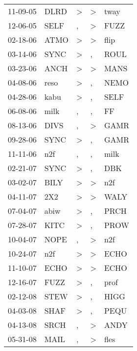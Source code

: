 \begin{supertabular}{lllll}
 11-09-05 &   DLRD &     \textgreater &     \textgreater &   tway \\
 12-06-05 &   SELF &                , &     \textgreater &   FUZZ \\
 02-18-06 &   ATMO &     \textgreater &     \textgreater &   flip \\
 03-14-06 &   SYNC &     \textgreater &                , &   ROUL \\
 03-23-06 &   ANCH &     \textgreater &     \textgreater &   MANS \\
 04-08-06 &   reso &     \textgreater &                , &   NEMO \\
 04-28-06 &   kabu &     \textgreater &                , &   SELF \\
 06-08-06 &   milk &                , &                , &     FF \\
 08-13-06 &   DIVS &                , &     \textgreater &   GAMR \\
 09-28-06 &   SYNC &     \textgreater &                , &   GAMR \\
 11-11-06 &    n2f &                , &                , &   milk \\
 02-21-07 &   SYNC &     \textgreater &                , &    DBK \\
 03-02-07 &   BILY &     \textgreater &     \textgreater &    n2f \\
 04-11-07 &    2X2 &     \textgreater &     \textgreater &   WALY \\
 07-04-07 &   abiw &     \textgreater &                , &   PRCH \\
 07-28-07 &   KITC &     \textgreater &                , &   PROW \\
 10-04-07 &   NOPE &                , &     \textgreater &    n2f \\
 10-24-07 &    n2f &     \textgreater &     \textgreater &   ECHO \\
 11-10-07 &   ECHO &     \textgreater &     \textgreater &   ECHO \\
 12-16-07 &   FUZZ &     \textgreater &                , &   prof \\
 02-12-08 &   STEW &     \textgreater &                , &   HIGG \\
 04-03-08 &   SHAF &     \textgreater &                , &   PEQU \\
 04-13-08 &   SRCH &                , &     \textgreater &   ANDY \\
 05-31-08 &   MAIL &                , &     \textgreater &   fles \\

\end{supertabular}
